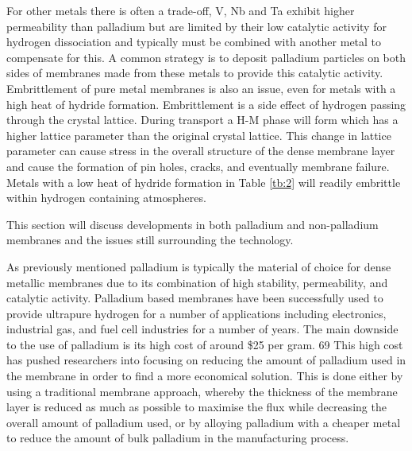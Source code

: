 For other metals there is often a trade-off, V, Nb and Ta exhibit higher permeability than 
palladium but are limited by their low catalytic activity for hydrogen dissociation and 
typically must be combined with another metal to compensate for this. A common strategy is 
to deposit palladium particles on both sides of membranes made from these metals to provide 
this catalytic activity. Embrittlement of pure metal membranes is also an issue, even for 
metals with a high heat of hydride formation. Embrittlement is a side effect of hydrogen 
passing through the crystal lattice. During transport a H-M phase will form which has a 
higher lattice parameter than the original crystal lattice. This change in lattice parameter 
can cause stress in the overall structure of the dense membrane layer and cause the formation 
of pin holes, cracks, and eventually membrane failure. Metals with a low heat of hydride 
formation in Table \ref{tb:2} will readily embrittle within hydrogen containing atmospheres.

This section will discuss developments in both palladium and non-palladium membranes and the issues still surrounding the technology.

As previously mentioned palladium is typically the material of choice for dense metallic 
membranes due to its combination of high stability, permeability, and catalytic activity. 
Palladium based membranes have been successfully used to provide ultrapure hydrogen for a 
number of applications including electronics, industrial gas, and fuel cell industries for a 
number of years. The main downside to the use of palladium is its high cost of around \$25 
per gram. 69 This high cost has pushed researchers into focusing on reducing the amount of 
palladium used in the membrane in order to find a more economical solution. This is done 
either by using a traditional membrane approach, whereby the thickness of the membrane layer 
is reduced as much as possible to maximise the flux while decreasing the overall amount of 
palladium used, or by alloying palladium with a cheaper metal to reduce the amount of bulk 
palladium in the manufacturing process. 

